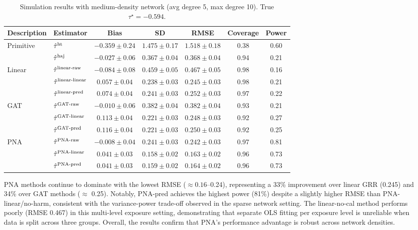\documentclass[twoside,letterpaper]{article}
\theoremstyle{plain}
\theoremstyle{definition}
\theoremstyle{remark}
\newcommand{\hort}{\textup{ht}}
\newcommand{\haj}{\textup{haj}}
\begin{document}
\begin{table}[h]
    \centering
    \caption{Simulation results with medium-density network (avg degree 5, max degree 10). True $\tau^\star = -0.594$.}
    \small
    \begin{tabular}{ll|ccc|cc}
        \toprule
        Description & Estimator & Bias & SD & RMSE & Coverage & Power \\
        \midrule
        Primitive  & $\hat\tau^{\hort}$ & $-0.359 \pm 0.24$ & $1.475 \pm 0.17$ & $1.518 \pm 0.18$ & 0.38 & 0.60 \\
        & $\hat\tau^{\haj}$ & $-0.027 \pm 0.06$ & $0.367 \pm 0.04$ & $0.368 \pm 0.04$ & 0.94 & 0.21 \\
        \midrule
        Linear  
        & $\hat\tau^{\textup{linear-raw}}$ & $-0.084 \pm 0.08$ & $0.459 \pm 0.05$ & $0.467 \pm 0.05$ & 0.98 & 0.16 \\
        & $\hat\tau^{\textup{linear-linear}}$ & $0.057 \pm 0.04$ & $0.238 \pm 0.03$ & $0.245 \pm 0.03$ & 0.98 & 0.21 \\
        & $\hat\tau^{\textup{linear-pred}}$ & $0.074 \pm 0.04$ & $0.241 \pm 0.03$ & $0.252 \pm 0.03$ & 0.97 & 0.22 \\
        \midrule
        GAT
        & $\hat\tau^{\textup{GAT-raw}}$ & $-0.010 \pm 0.06$ & $0.382 \pm 0.04$ & $0.382 \pm 0.04$ & 0.93 & 0.21 \\
        & $\hat\tau^{\textup{GAT-linear}}$ & $0.113 \pm 0.04$ & $0.221 \pm 0.03$ & $0.248 \pm 0.03$ & 0.92 & 0.27 \\
        & $\hat\tau^{\textup{GAT-pred}}$ & $0.116 \pm 0.04$ & $0.221 \pm 0.03$ & $0.250 \pm 0.03$ & 0.92 & 0.25 \\
        \midrule
        PNA 
        & $\hat\tau^{\textup{PNA-raw}}$ & $\mathbf{-0.008 \pm 0.04}$ & $\mathbf{0.241 \pm 0.03}$ & $\mathbf{0.242 \pm 0.03}$ & 0.97 & 0.81 \\
        & $\hat\tau^{\textup{PNA-linear}}$ & $\mathbf{0.041 \pm 0.03}$ & $\mathbf{0.158 \pm 0.02}$ & $\mathbf{0.163 \pm 0.02}$ & 0.96 & 0.73 \\
        & $\hat\tau^{\textup{PNA-pred}}$ & $\mathbf{0.041 \pm 0.03}$ & $\mathbf{0.159 \pm 0.02}$ & $\mathbf{0.164 \pm 0.02}$ & 0.96 & 0.73 \\
        \bottomrule
    \end{tabular}
    \label{tab::simu_out2_results}
\end{table}

PNA methods continue to dominate with the lowest RMSE ($\approx 0.16$--0.24), representing a 33\% improvement over linear GRR (0.245) and 34\% over GAT methods ($\approx$ 0.25). Notably, PNA-pred achieves the highest power (81\%) despite a slightly higher RMSE than PNA-linear/no-harm, consistent with the variance-power trade-off observed in the sparse network setting. The linear-no-cal method performs poorly (RMSE 0.467) in this multi-level exposure setting, demonstrating that separate OLS fitting per exposure level is unreliable when data is split across three groups. Overall, the results confirm that PNA's performance advantage is robust across network densities.
\end{document}
